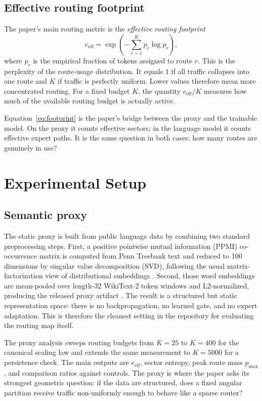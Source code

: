\documentclass[10pt,letterpaper]{article}
\begin{document}
\subsection{Effective routing footprint}
The paper's main routing metric is the \emph{effective routing footprint}
\begin{equation}
e_{\mathrm{eff}} = \exp\!\left(-\sum_{r=1}^{K} p_r \log p_r\right),
\label{eq:footprint}
\end{equation}
where $p_r$ is the empirical fraction of tokens assigned to route $r$. This is the perplexity of the route-usage distribution. It equals $1$ if all traffic collapses into one route and $K$ if traffic is perfectly uniform. Lower values therefore mean more concentrated routing. For a fixed budget $K$, the quantity $e_{\mathrm{eff}}/K$ measures how much of the available routing budget is actually active.

Equation~\eqref{eq:footprint} is the paper's bridge between the proxy and the trainable model. On the proxy it counts effective sectors; in the language model it counts effective expert paths. It is the same question in both cases: how many routes are genuinely in use?

\section{Experimental Setup}
\subsection{Semantic proxy}
The static proxy is built from public language data by combining two standard preprocessing steps. First, a positive pointwise mutual information (PPMI) co-occurrence matrix is computed from Penn Treebank text and reduced to 100 dimensions by singular value decomposition (SVD), following the usual matrix-factorization view of distributional embeddings \citep{levy2014neural}. Second, those word embeddings are mean-pooled over length-32 WikiText-2 token windows and L2-normalized, producing the released proxy artifact . The result is a structured but static representation space: there is no backpropagation, no learned gate, and no expert adaptation. This is therefore the cleanest setting in the repository for evaluating the routing map itself.

The proxy analysis sweeps routing budgets from $K=25$ to $K=400$ for the canonical scaling law and extends the same measurement to $K=5000$ for a persistence check. The main outputs are $e_{\mathrm{eff}}$, sector entropy, peak route mass $p_{\max}$, and comparison ratios against controls. The proxy is where the paper asks its strongest geometric question: if the data are structured, does a fixed angular partition receive traffic non-uniformly enough to behave like a sparse router?
\end{document}

